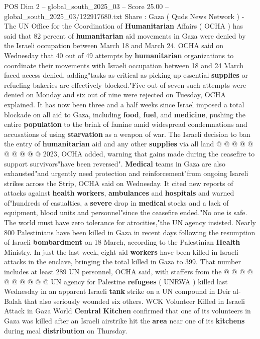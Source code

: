 \begin{textsample}{POS Dim 2 – global\_south\_2025\_03 – Score 25.00 – global\_south\_2025\_03/122917680.txt}  \label{ex:f2_pos_304}
Share : Gaza ( Quds News Network ) - The UN Office for the Coordination of \textbf{Humanitarian} Affairs ( OCHA ) has said that 82 percent of \textbf{humanitarian} aid movements in Gaza were denied by the Israeli occupation between March 18 and March 24.
OCHA said on Wednesday that 40 out of 49 attempts by \textbf{humanitarian} organizations to coordinate their movements with Israeli occupation between 18 and 24 March faced access denied, adding"tasks as critical as picking up essential \textbf{supplies} or refueling bakeries are effectively blocked."Five out of seven such attempts were denied on Monday and six out of nine were rejected on Tuesday, OCHA explained.
It has now been three and a half weeks since Israel imposed a total blockade on all aid to Gaza, including \textbf{food}, \textbf{fuel}, and \textbf{medicine}, pushing the entire \textbf{population} to the brink of famine amid widespread condemnations and accusations of using \textbf{starvation} as a weapon of war.
The Israeli decision to ban the entry of \textbf{humanitarian} aid and any other \textbf{supplies} via all land @ @ @ @ @ @ @ @ @ @ 2023, OCHA added, warning that gains made during the ceasefire to support survivors"have been reversed". \textbf{Medical} teams in Gaza are also exhausted"and urgently need protection and reinforcement"from ongoing Isareli strikes across the Strip, OCHA said on Wednesday.
It cited new reports of attacks against \textbf{health} \textbf{workers}, \textbf{ambulances} and \textbf{hospitals} and warned of"hundreds of casualties, a \textbf{severe} drop in \textbf{medical} stocks and a lack of equipment, blood units and personnel"since the ceasefire ended."No one is safe.
The world must have zero tolerance for atrocities,"the UN agency insisted.
Nearly 800 Palestinians have been killed in Gaza in recent days following the resumption of Israeli \textbf{bombardment} on 18 March, according to the Palestinian \textbf{Health} Ministry.
In just the last week, eight aid \textbf{workers} have been killed in Israeli attacks in the enclave, bringing the total killed in Gaza to 399.
That number includes at least 289 UN personnel, OCHA said, with staffers from the @ @ @ @ @ @ @ @ @ @ UN agency for Palestine \textbf{refugees} ( UNRWA ) killed last Wednesday in an apparent Israeli \textbf{tank} strike on a UN compound in Deir al-Balah that also seriously wounded six others.
WCK Volunteer Killed in Israeli Attack in Gaza World \textbf{Central} \textbf{Kitchen} confirmed that one of its volunteers in Gaza was killed after an Israeli airstrike hit the \textbf{area} near one of its \textbf{kitchens} during meal \textbf{distribution} on Thursday.

\end{textsample}
